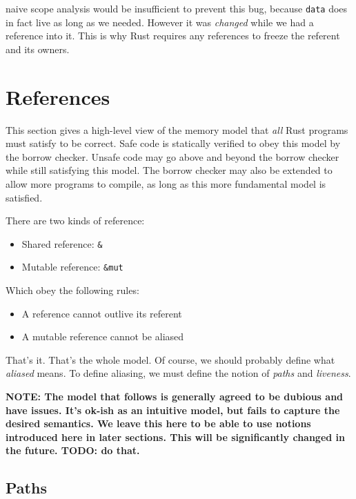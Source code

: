 \documentclass[a4paper,]{book}
\providecommand{\tightlist}{%
  \setlength{\itemsep}{0pt}\setlength{\parskip}{0pt}}
\begin{document}
naive scope analysis would be insufficient to prevent this bug, because
\texttt{data} does in fact live as long as we needed. However it was
\emph{changed} while we had a reference into it. This is why Rust
requires any references to freeze the referent and its owners.

\section{References}\label{sec--references}

This section gives a high-level view of the memory model that \emph{all}
Rust programs must satisfy to be correct. Safe code is statically
verified to obey this model by the borrow checker. Unsafe code may go
above and beyond the borrow checker while still satisfying this model.
The borrow checker may also be extended to allow more programs to
compile, as long as this more fundamental model is satisfied.

There are two kinds of reference:

\begin{itemize}
\tightlist
\item
  Shared reference: \texttt{\&}
\item
  Mutable reference: \texttt{\&mut}
\end{itemize}

Which obey the following rules:

\begin{itemize}
\tightlist
\item
  A reference cannot outlive its referent
\item
  A mutable reference cannot be aliased
\end{itemize}

That's it. That's the whole model. Of course, we should probably define
what \emph{aliased} means. To define aliasing, we must define the notion
of \emph{paths} and \emph{liveness}.

\textbf{NOTE: The model that follows is generally agreed to be dubious
and have issues. It's ok-ish as an intuitive model, but fails to capture
the desired semantics. We leave this here to be able to use notions
introduced here in later sections. This will be significantly changed in
the future. TODO: do that.}

\subsection{Paths}\label{paths}
\end{document}
